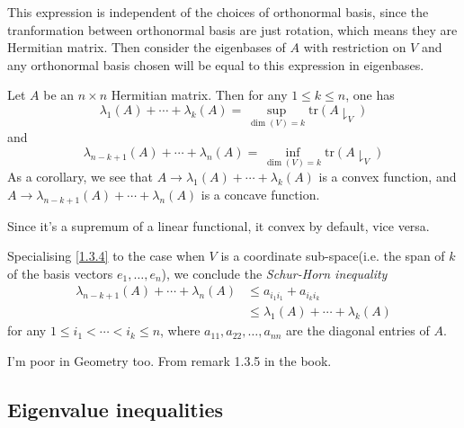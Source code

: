 This expression is independent of the choices of orthonormal basis, since the tranformation between orthonormal basis are just rotation, which means they are Hermitian matrix. 
Then consider the eigenbases of $A$ with restriction on $V$ and any orthonormal basis chosen will be equal to this expression in eigenbases.

\begin{proposition}
    \label{1.3.4}
    Let $A$ be an $n\times n$ Hermitian matrix. Then for any $1\leq k\leq n$, one has 
    \begin{equation*}
        \lambda_1(A)+\cdots+\lambda_k(A)=\sup_{\dim(V)=k} \mathrm{tr}(A\downharpoonright_V)
    \end{equation*}
    and
    \begin{equation*}
        \lambda_{n-k+1}(A)+\cdots+\lambda_n(A)=\inf_{\dim(V)=k} \mathrm{tr}(A\downharpoonright_V)
    \end{equation*}
    As a corollary, we see that $A\to \lambda_1(A)+\cdots+\lambda_k(A)$ is a convex function, and $A\to \lambda_{n-k+1}(A)+\cdots+\lambda_n(A)$ is a concave function. 
\end{proposition}

Since it's a supremum of a linear functional, it convex by default, vice versa.

\begin{remark}
    Specialising \ref{1.3.4} to the case when $V$ is a coordinate sub-space(i.e. the span of $k$ of the basis vectors $e_1,\dots,e_n$), we conclude the \textit{Schur-Horn inequality}
    \begin{equation}\label{schur-horn}
        \begin{aligned}
            \lambda_{n-k+1}(A)+\cdots+\lambda_n(A)&\leq a_{{i_1}{i_1}}+a_{{i_k}{i_k}} \\
            & \leq \lambda_1(A)+\cdots+\lambda_k(A)
        \end{aligned}
    \end{equation}
    for any $1\leq i_1 < \cdots < i_k \leq n$, where $a_{11},a_{22},\dots,a_{nn}$ are the diagonal entries of $A$.
\end{remark}

I'm poor in Geometry too. From remark 1.3.5 in the book.

\subsection{Eigenvalue inequalities}

